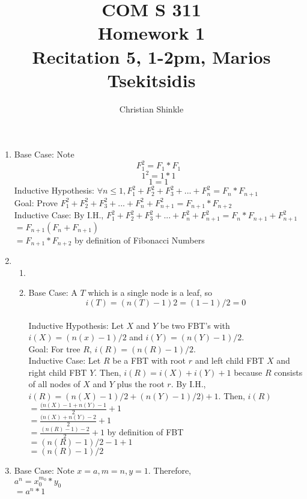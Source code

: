 \documentclass{article}
\begin{document}
 	\title{COM S 311\large \\Homework 1\\Recitation 5, 1-2pm, Marios Tsekitsidis}
	\author{Christian Shinkle}
	\maketitle
	\begin{enumerate}
		\item Base Case: Note
		\[F^2_1=F_1*F_1\]
		\[1^2=1*1\]
		\[1=1\]
		Inductive Hypothesis: $\forall n\leq 1, F^2_1+F^2_2+F^2_3+...+F^2_n=F_n*F_{n+1}$\\
		Goal: Prove $F^2_1+F^2_2+F^2_3+...+F^2_n+F^2_{n+1}=F_{n+1}*F_{n+2}$\\
		Inductive Case: By I.H., 
		$F^2_1+F^2_2+F^2_3+...+F^2_n+F^2_{n+1}=F_n*F_{n+1}+F^2_{n+1}$\\
		$=F_{n+1}(F_n+F_{n+1})$\\
		$=F_{n+1}*F_{n+2}$ by definition of Fibonacci Numbers\\ 
		\item
		\begin{enumerate}
		\item 
		\item Base Case: A $T$ which is a single node is a leaf, so \[i(T)=(n(T)-1)2=(1-1)/2=0\]\\
		Inductive Hypothesis: Let $X$ and $Y$ be two FBT's with $i(X)=(n(x)-1)/2$ and 
		$i(Y)=(n(Y)-1)/2$.\\
		Goal: For tree $R$, $i(R)=(n(R)-1)/2$.\\
		Inductive Case: Let $R$ be a FBT with root $r$ and left child FBT $X$ and right child FBT $Y$. 
		Then, $i(R)=i(X)+i(Y)+1$ because $R$ consists of all nodes of $X$ and $Y$ plus the root $r$.
		By I.H., \\$i(R)=(n(X)-1)/2+(n(Y)-1)/2)+1$. Then, $i(R)$\\
		$=\frac{(n(X)-1+n(Y)-1}{2}+1$\\
		$=\frac{(n(X)+n(Y)-2}{2}+1$\\
		$=\frac{(n(R)-1)-2}{2}+1$ by definition of FBT\\
		$=(n(R)-1)/2-1+1$\\
		$=(n(R)-1)/2$\\
		\end{enumerate}
		\item Base Case: Note $x=a, m=n, y=1$. Therefore, \\
		$a^n=x^{m_0}_0*y_0$\\
		$=a^n*1$\\

\end{enumerate}
\end{document}
